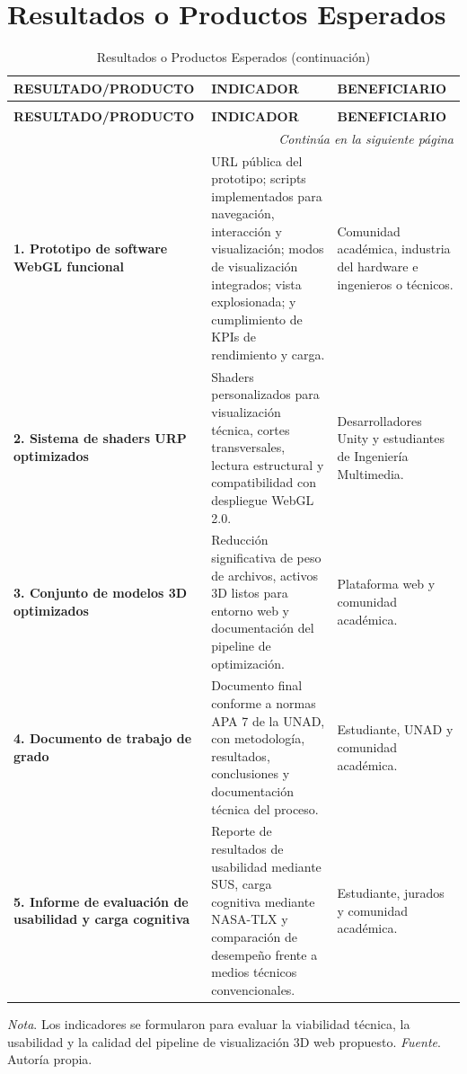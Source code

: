 \section{Resultados o Productos Esperados}

\setlength{\LTpre}{0pt}
\setlength{\LTpost}{0pt}
\small
\begin{longtable}{p{5.2cm}p{5.0cm}p{3.5cm}}
\caption{Resultados o Productos Esperados} \\
\hline
\textbf{RESULTADO/PRODUCTO} & \textbf{INDICADOR} & \textbf{BENEFICIARIO} \\ \hline
\endfirsthead

\caption[]{Resultados o Productos Esperados (continuaci\'on)} \\
\hline
\textbf{RESULTADO/PRODUCTO} & \textbf{INDICADOR} & \textbf{BENEFICIARIO} \\ \hline
\endhead

\hline
\multicolumn{3}{r}{\textit{Contin\'ua en la siguiente p\'agina}} \\
\endfoot

\hline
\endlastfoot

\textbf{1. Prototipo de software WebGL funcional} &
URL p\'ublica del prototipo; scripts implementados para navegaci\'on, interacci\'on y visualizaci\'on; modos de visualizaci\'on integrados; vista explosionada; y cumplimiento de KPIs de rendimiento y carga. &
Comunidad acad\'emica, industria del hardware e ingenieros o t\'ecnicos. \\

\textbf{2. Sistema de shaders URP optimizados} &
Shaders personalizados para visualizaci\'on t\'ecnica, cortes transversales, lectura estructural y compatibilidad con despliegue WebGL 2.0. &
Desarrolladores Unity y estudiantes de Ingenier\'ia Multimedia. \\

\textbf{3. Conjunto de modelos 3D optimizados} &
Reducci\'on significativa de peso de archivos, activos 3D listos para entorno web y documentaci\'on del pipeline de optimizaci\'on. &
Plataforma web y comunidad acad\'emica. \\

\textbf{4. Documento de trabajo de grado} &
Documento final conforme a normas APA 7 de la UNAD, con metodolog\'ia, resultados, conclusiones y documentaci\'on t\'ecnica del proceso. &
Estudiante, UNAD y comunidad acad\'emica. \\

\textbf{5. Informe de evaluaci\'on de usabilidad y carga cognitiva} &
Reporte de resultados de usabilidad mediante SUS, carga cognitiva mediante NASA-TLX y comparaci\'on de desempe\~no frente a medios t\'ecnicos convencionales. &
Estudiante, jurados y comunidad acad\'emica. \\
\end{longtable}
\normalsize

\par\vspace{0.5\baselineskip}
\textit{Nota}. Los indicadores se formularon para evaluar la viabilidad t\'ecnica, la usabilidad y la calidad del pipeline de visualizaci\'on 3D web propuesto. \textit{Fuente}. Autor\'ia propia.

\newpage
